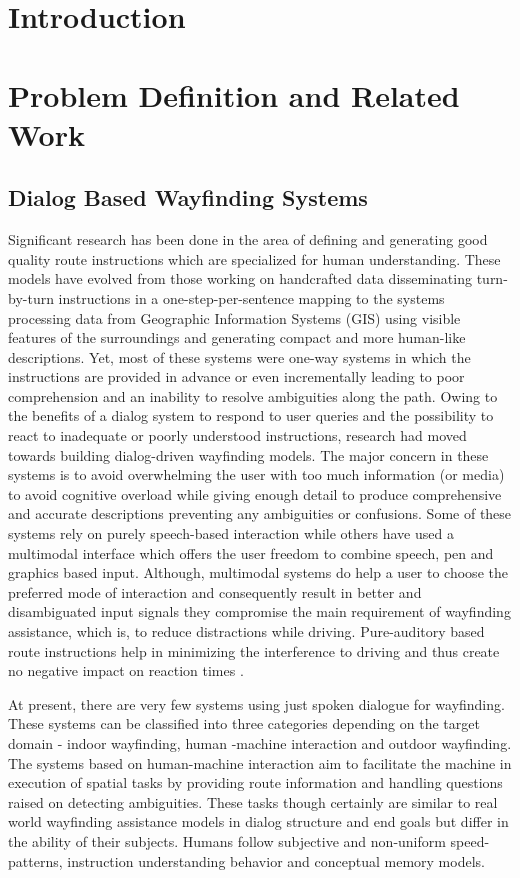 \documentclass{iitkthesis}
\begin{document}
\chapter{Introduction}
 \chapter{Problem Definition and Related Work}
 \section{Dialog Based Wayfinding Systems} 
Significant research has been done in the area of defining 
\cite{lovelace} and generating \cite{Dale,Habel,Maab,pattabhiraman} good 
quality route instructions which are specialized for human understanding. 
These models have evolved from those working on handcrafted data 
disseminating turn-by-turn instructions in a one-step-per-sentence 
mapping to the systems processing data from Geographic Information 
Systems (GIS) using visible features of the surroundings and generating 
compact and more human-like descriptions. Yet, most of these systems were 
one-way systems in which the instructions are provided in advance or 
even incrementally leading to poor comprehension and 
an inability to resolve ambiguities along the path. Owing to the 
benefits of a dialog system to respond to user queries and the possibility to 
react to inadequate or poorly understood instructions, research  
\cite{hurtig, jokinen, richter} had moved towards building dialog-driven 
wayfinding models. The major concern in these systems is to avoid 
overwhelming the user with too much information (or media) to avoid cognitive 
overload while giving enough detail to produce comprehensive and accurate 
descriptions preventing any ambiguities or confusions. Some \cite{richter} 
of these systems rely on purely speech-based interaction while others 
\cite{hurtig,jokinen} have used a multimodal interface which offers the user 
freedom to combine speech, pen and graphics based input. 
Although, multimodal systems do help a user to choose the preferred mode of
interaction and consequently result in better and disambiguated input signals
they compromise the main requirement of wayfinding assistance, which is, to 
reduce distractions while driving. 
Pure-auditory based route instructions help in minimizing the 
interference to driving and thus create no negative impact on reaction 
times \cite{srinivasaneffect}. 
 
At present, there are very few systems using just spoken 
dialogue for wayfinding. These systems can be classified into 
three categories depending on the target domain - indoor wayfinding, human
-machine interaction and outdoor wayfinding. The systems \cite{fongsurvey} 
based on human-machine interaction aim to facilitate the machine in 
execution of spatial tasks by providing route information and handling 
questions raised on detecting ambiguities. These tasks though 
certainly are similar to real world wayfinding assistance models in 
dialog structure and end goals but differ in the ability of their subjects. 
Humans follow subjective and non-uniform speed-patterns, instruction 
understanding behavior and conceptual memory models. 
\end{document}
